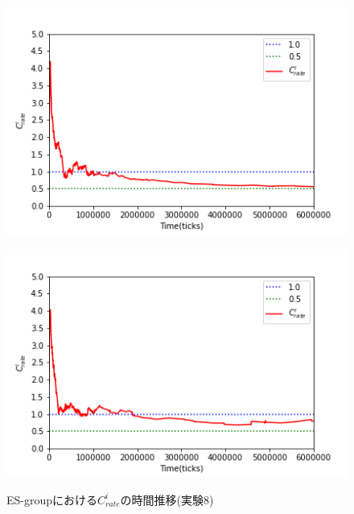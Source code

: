 \documentclass[12pt,a4j,twoside]{jarticle}
\begin{document}
  \begin{figure}
    \begin{minipage}{0.48\hsize}
      \centering
      \includegraphics[width=0.99\hsize]{figures/Rate_Complex_ESgroup_0.png}
      \label{subfig:rate_Complex_ES_0}
    \end{minipage}
    \hfill
    \begin{minipage}{0.48\hsize}
      \centering
      \includegraphics[width=0.99\hsize]{figures/Rate_Complex_ESgroup_3.png}
      \label{subfig:rate_Complex_ES_3}
    \end{minipage}
    \caption{ES-groupにおける$C^i_{rate}$の時間推移(実験8)}
    \label{fig:rate_Complex_ES}
  \end{figure}
\end{document}
